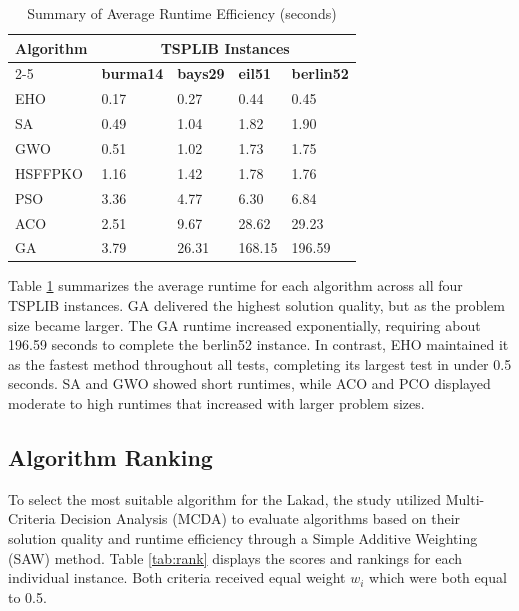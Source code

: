 \begin{table}[H]
	\centering
	\singlespacing
	\caption{Summary of Average Runtime Efficiency (seconds)}
	\label{tab:runtime} \renewcommand{\arraystretch}{1.2}
	\begin{tabularx}{\linewidth}{XXXXX}
		\toprule
        \multirow{2}{*}{\textbf{Algorithm}} & \multicolumn{4}{c}{\textbf{TSPLIB Instances}}  \\
        \cmidrule(lr){2-5}
         & \textbf{burma14} & \textbf{bays29} & \textbf{eil51} & \textbf{berlin52} \\
		\midrule
        EHO     & 0.17 & 0.27   & 0.44      & 0.45    \\
        SA      & 0.49 & 1.04   & 1.82      & 1.90    \\
        GWO     & 0.51 & 1.02   & 1.73      & 1.75    \\
        HSFFPKO & 1.16 & 1.42   & 1.78      & 1.76    \\
        PSO     & 3.36 & 4.77   & 6.30      & 6.84    \\
        ACO     & 2.51 & 9.67   & 28.62     & 29.23   \\
        GA      & 3.79 & 26.31  & 168.15    & 196.59  \\
		\bottomrule
	\end{tabularx}
\end{table}

Table \ref{tab:runtime} summarizes the average runtime for each algorithm across all four TSPLIB instances. GA delivered the highest solution quality, but as the problem size became larger. The GA runtime increased exponentially, requiring about 196.59 seconds to complete the berlin52 instance. In contrast, EHO maintained it as the fastest method throughout all tests, completing its largest test in under 0.5 seconds. SA and GWO showed short runtimes, while ACO and PCO displayed moderate to high runtimes that increased with larger problem sizes.

\subsection{Algorithm Ranking}

To select the most suitable algorithm for the Lakad, the study utilized Multi-Criteria Decision Analysis (MCDA) to evaluate algorithms based on their solution quality and runtime efficiency through a Simple Additive Weighting (SAW) method. Table \ref{tab:rank} displays the scores and rankings for each individual instance. Both criteria received equal weight \( w_{i} \) which were both equal to 0.5.

